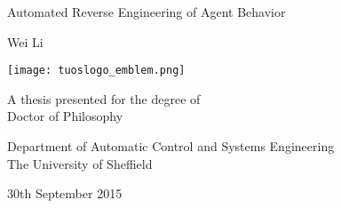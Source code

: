 

\begin{titlepage}
\begin{center}

	\vspace*{0.5cm}
	
	{\Large {Automated Reverse Engineering of Agent Behavior}}
	
	\vspace{1.0cm}
	
	{\large Wei Li}
	
	\vspace{1.5cm}
	
	\texttt{[image: tuoslogo\_emblem.png]}
	
	\vspace{1.0cm}
	
	{\large A thesis presented for the degree of\\Doctor of Philosophy}
	
	\vspace{1.0cm}
	
	
	{\large Department of Automatic Control and Systems Engineering}\\
	\vspace{0.5cm}
	{\large The University of Sheffield}\\
	
	\vfill
	
	{\large 30th September 2015}
	
\end{center}
\end{titlepage}

